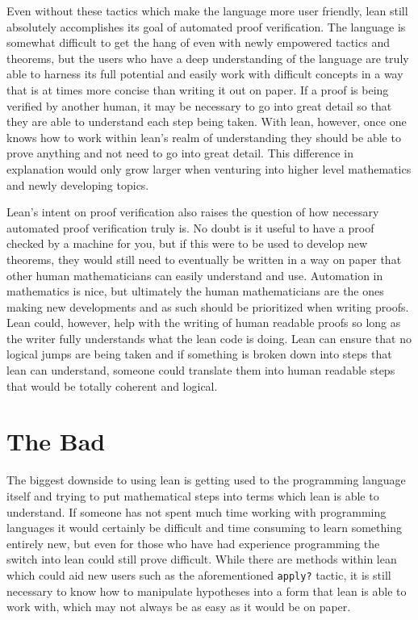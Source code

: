 \documentclass[
  letterpaper,
]{scrreprt}
\theoremstyle{remark}
\begin{document}
Even without these tactics which make the language more user friendly,
lean still absolutely accomplishes its goal of automated proof
verification. The language is somewhat difficult to get the hang of even
with newly empowered tactics and theorems, but the users who have a deep
understanding of the language are truly able to harness its full
potential and easily work with difficult concepts in a way that is at
times more concise than writing it out on paper. If a proof is being
verified by another human, it may be necessary to go into great detail
so that they are able to understand each step being taken. With lean,
however, once one knows how to work within lean's realm of understanding
they should be able to prove anything and not need to go into great
detail. This difference in explanation would only grow larger when
venturing into higher level mathematics and newly developing topics.

Lean's intent on proof verification also raises the question of how
necessary automated proof verification truly is. No doubt is it useful
to have a proof checked by a machine for you, but if this were to be
used to develop new theorems, they would still need to eventually be
written in a way on paper that other human mathematicians can easily
understand and use. Automation in mathematics is nice, but ultimately
the human mathematicians are the ones making new developments and as
such should be prioritized when writing proofs. Lean could, however,
help with the writing of human readable proofs so long as the writer
fully understands what the lean code is doing. Lean can ensure that no
logical jumps are being taken and if something is broken down into steps
that lean can understand, someone could translate them into human
readable steps that would be totally coherent and logical.

\hypertarget{the-bad}{%
\section{The Bad}\label{the-bad}}

The biggest downside to using lean is getting used to the programming
language itself and trying to put mathematical steps into terms which
lean is able to understand. If someone has not spent much time working
with programming languages it would certainly be difficult and time
consuming to learn something entirely new, but even for those who have
had experience programming the switch into lean could still prove
difficult. While there are methods within lean which could aid new users
such as the aforementioned \texttt{apply?} tactic, it is still necessary
to know how to manipulate hypotheses into a form that lean is able to
work with, which may not always be as easy as it would be on paper.
\end{document}
